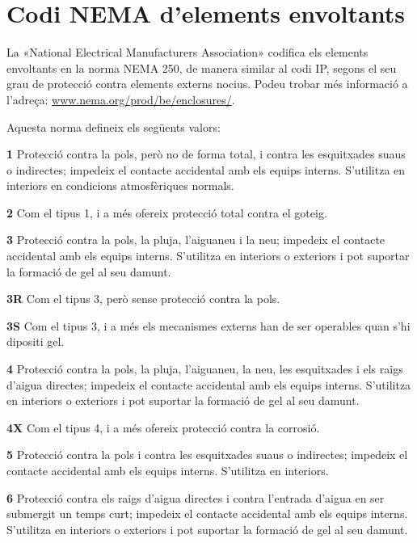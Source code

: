 \section{Codi NEMA d'elements envoltants}
 

La «National Electrical Manufacturers Association»
codifica els elements envoltants en la norma NEMA 250, de manera similar al codi IP, segons el seu grau de protecció contra elements externs nocius. Podeu trobar més informació a l'adreça: \href{http://www.nema.org/prod/be/enclosures/}{www.nema.org/prod/be/enclosures/}.

Aquesta norma defineix els següents valors:

\begin{list}{}
   {\setlength{\labelwidth}{10mm} \setlength{\leftmargin}{10mm} \setlength{\labelsep}{2mm}}
   \item[\textbf{1}] Protecció contra la pols, però no de forma total, i contra les esquitxades suaus o indirectes; impedeix el contacte accidental amb els equips interns. S'utilitza en interiors en condicions atmosfèriques normals.
   \item[\textbf{2}] Com el tipus 1, i a més ofereix protecció total contra el goteig.
   \item[\textbf{3}] Protecció contra la pols, la pluja, l'aiguaneu i la neu; impedeix el contacte accidental amb els equips interns. S'utilitza en interiors o exteriors i pot suportar la formació de gel al seu damunt.
   \item[\textbf{3R}] Com el tipus 3, però sense protecció contra la pols.
   \item[\textbf{3S}] Com el tipus 3, i a més els mecanismes externs han de ser operables quan s'hi dipositi gel.
    \item[\textbf{4}] Protecció contra la pols, la pluja, l'aiguaneu, la neu, les esquitxades i els raigs d'aigua directes; impedeix el contacte accidental amb els equips interns. S'utilitza en interiors o exteriors i pot suportar la formació de gel al seu damunt.
   \item[\textbf{4X}] Com el tipus 4, i a més ofereix protecció contra la corrosió.
   \item[\textbf{5}] Protecció contra la pols i contra les esquitxades suaus o indirectes; impedeix el contacte accidental amb els equips interns. S'utilitza en interiors.
   \item[\textbf{6}] Protecció contra els raigs d'aigua directes i contra l'entrada d'aigua en ser submergit un temps curt; impedeix el contacte accidental amb els equips interns. S'utilitza en interiors o exteriors i pot suportar la formació de gel al seu damunt.

\end{list}
